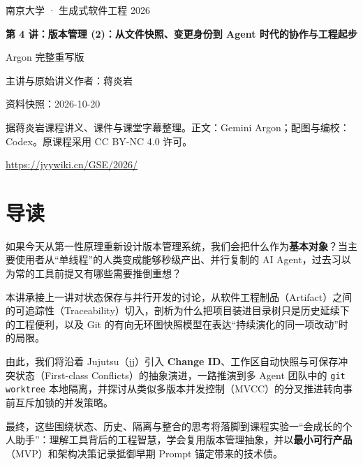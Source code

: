 \documentclass[UTF8,a4paper,11pt,fontset=fandol]{ctexart}
\begin{document}
\begin{titlepage}\centering\vspace*{25mm}

{\Large 南京大学 · 生成式软件工程 2026\par}\vspace{12mm}

{\Huge\bfseries 第 4 讲：版本管理 (2)：从文件快照、变更身份到 Agent 时代的协作与工程起步\par}\vspace{10mm}

{\Large Argon 完整重写版\par}\vspace{10mm}

主讲与原始讲义作者：蒋炎岩\par

资料快照：2026-10-20\par\vfill

据蒋炎岩课程讲义、课件与课堂字幕整理。正文：Gemini Argon；配图与编校：Codex。原课程采用 CC BY-NC 4.0 许可。

\vspace{8mm}\url{https://jyywiki.cn/GSE/2026/}

\end{titlepage}

\tableofcontents\clearpage

\section*{导读}

如果今天从第一性原理重新设计版本管理系统，我们会把什么作为\textbf{基本对象}？当主要使用者从“单线程”的人类变成能够秒级产出、并行复制的 AI Agent，过去习以为常的工具前提又有哪些需要推倒重想？

本讲承接上一讲对状态保存与并行开发的讨论，从软件工程制品（Artifact）之间的可追踪性（Traceability）切入，剖析为什么把项目装进目录树只是历史延续下的工程便利，以及 Git 的有向无环图快照模型在表达“持续演化的同一项改动”时的局限。

由此，我们将沿着 Jujutsu（jj）引入 \textbf{Change ID}、工作区自动快照与可保存冲突状态（First-class Conflicts）的抽象演进，一路推演到多 Agent 团队中的 \texttt{git worktree} 本地隔离，并探讨从类似多版本并发控制（MVCC）的分叉推进转向事前互斥加锁的并发策略。

最终，这些围绕状态、历史、隔离与整合的思考将落脚到课程实验一“会成长的个人助手”：理解工具背后的工程智慧，学会复用版本管理抽象，并以\textbf{最小可行产品}（MVP）和架构决策记录抵御早期 Prompt 锚定带来的技术债。
\end{document}
